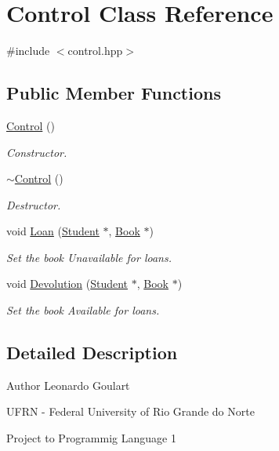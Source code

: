 \hypertarget{classControl}{}\section{Control Class Reference}
\label{classControl}


{\ttfamily \#include $<$control.\+hpp$>$}

\subsection*{Public Member Functions}
\begin{DoxyCompactItemize}
\item 
\hyperlink{classControl_aa730aeda4517f40bc48ba1e46ebded77}{Control} ()
\begin{DoxyCompactList}\small\item\em Constructor. \end{DoxyCompactList}\item 
\hyperlink{classControl_aedda1328c4f8b8d49bca8f0812d3bfd1}{$\sim$\+Control} ()
\begin{DoxyCompactList}\small\item\em Destructor. \end{DoxyCompactList}\item 
void \hyperlink{classControl_aad3bf28201b263e11f3f3b415f0812de}{Loan} (\hyperlink{classStudent}{Student} $\ast$, \hyperlink{classBook}{Book} $\ast$)
\begin{DoxyCompactList}\small\item\em Set the book Unavailable for loans. \end{DoxyCompactList}\item 
void \hyperlink{classControl_ad908e09fedd730c8657acb89ed488a47}{Devolution} (\hyperlink{classStudent}{Student} $\ast$, \hyperlink{classBook}{Book} $\ast$)
\begin{DoxyCompactList}\small\item\em Set the book Available for loans. \end{DoxyCompactList}\end{DoxyCompactItemize}


\subsection{Detailed Description}
\begin{DoxyAuthor}{Author}
Leonardo Goulart 

U\+F\+RN -\/ Federal University of Rio Grande do Norte 

Project to Programmig Language 1 
\end{DoxyAuthor}


